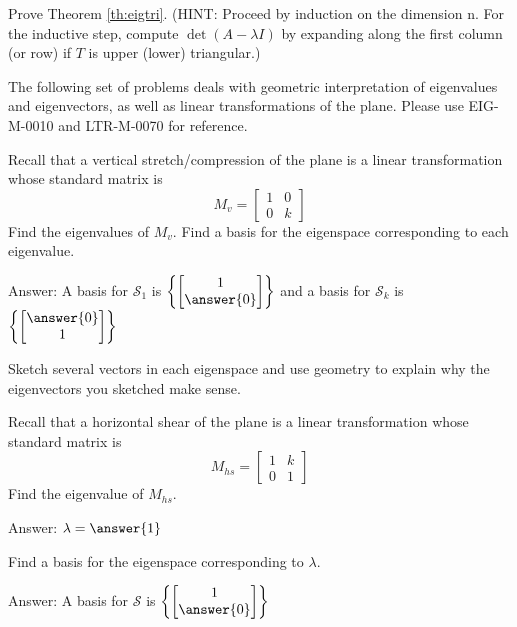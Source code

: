 \documentclass{ximera}
\begin{document}
\begin{problem}\label{prob:eigtri}
Prove Theorem \ref{th:eigtri}.  (HINT:  Proceed by induction on the dimension n.  For the inductive step, compute $\det(A-\lambda I)$ by expanding along the first column (or row) if $T$ is upper (lower) triangular.)
\end{problem}

\begin{problem}
The following set of problems deals with geometric interpretation of eigenvalues and eigenvectors, as well as linear transformations of the plane.  Please use EIG-M-0010 and LTR-M-0070 for reference.
\begin{problem}
Recall that a vertical stretch/compression of the plane is a linear transformation whose standard matrix is $$M_v=\begin{bmatrix}1&0\\0&k\end{bmatrix}$$
Find the eigenvalues of $M_v$.  Find a basis for the eigenspace corresponding to each eigenvalue.

Answer:  A basis for $\mathcal{S}_1$ is $\left\{\begin{bmatrix}1\\\answer{0}\end{bmatrix}\right\}$
and a basis for $\mathcal{S}_k$ is $\left\{\begin{bmatrix}\answer{0}\\1\end{bmatrix}\right\}$

Sketch several vectors in each eigenspace and use geometry to explain why the eigenvectors you sketched make sense.
\end{problem}

\begin{problem}
Recall that a horizontal shear of the plane is a linear transformation whose standard matrix is $$M_{hs}=\begin{bmatrix}1&k\\0&1\end{bmatrix}$$
Find the eigenvalue of $M_{hs}$.  

Answer: $\lambda=\answer{1}$

Find a basis for the eigenspace corresponding to $\lambda$.

Answer:  A basis for $\mathcal{S}$ is $\left\{\begin{bmatrix}1\\\answer{0}\end{bmatrix}\right\}$


\end{problem}
\end{problem}
\end{document}
